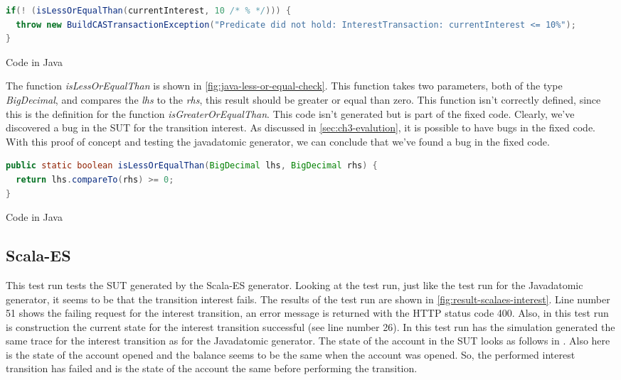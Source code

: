 \begin{sourcecode}[h!]
\begin{lstlisting}[language=Java]
if(! (isLessOrEqualThan(currentInterest, 10 /* % */))) {
  throw new BuildCASTransactionException("Predicate did not hold: InterestTransaction: currentInterest <= 10%");
}
\end{lstlisting}
\caption{Code in Java}
\label{fig:java-gen-interest-pre}
\end{sourcecode}

The function \textit{isLessOrEqualThan} is shown in
\autoref{fig:java-less-or-equal-check}. This function takes two parameters, both
of the type \textit{BigDecimal}, and compares the \textit{lhs} to the
\textit{rhs}, this result should be greater or equal than zero. This function
isn't correctly defined, since this is the definition for the function
\textit{isGreaterOrEqualThan}. This code isn't generated but is part of the
fixed code. Clearly, we've discovered a bug in the SUT for the transition
interest. As discussed in \autoref{sec:ch3-evalution}, it is possible to have
bugs in the fixed code. With this proof of concept and testing the javadatomic
generator, we can conclude that we've found a bug in the fixed code.

\begin{sourcecode}[h!]
\begin{lstlisting}[language=Java]
public static boolean isLessOrEqualThan(BigDecimal lhs, BigDecimal rhs) {
  return lhs.compareTo(rhs) >= 0;
}
\end{lstlisting}
\caption{Code in Java}
\label{fig:java-less-or-equal-check}
\end{sourcecode}

\subsection{Scala-ES}
\label{sec:bug-interest-scalaes}

This test run tests the SUT generated by the Scala-ES generator. Looking at the
test run, just like the test run for the Javadatomic generator, it seems to be
that the transition interest fails. The results of the test run are shown in
\autoref{fig:result-scalaes-interest}. Line number 51 shows the failing request
for the interest transition, an error message is returned with the HTTP status
code 400. Also, in this test run is construction the current state for the
interest transition successful (see line number 26). In this test run has the
simulation generated the same trace for the interest transition as for the
Javadatomic generator. The state of the account in the SUT looks as follows in
\label{fig:interest-opened-account-scalaes-json}. Also here is the state of the
account opened and the balance seems to be the same when the account was opened.
So, the performed interest transition has failed and is the state of the account
the same before performing the transition.

